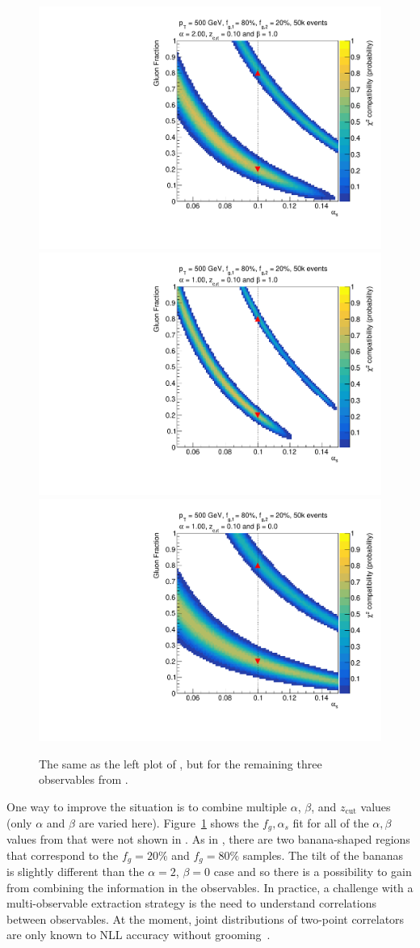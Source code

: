 \begin{figure}[t]
\begin{center}
\includegraphics[width = 0.32\columnwidth]{figures/banana_alpha_20beta_10_zcut_123451324.pdf}
\includegraphics[width = 0.32\columnwidth]{figures/banana_alpha_10beta_10_zcut_123451324.pdf}
\includegraphics[width = 0.32\columnwidth]{figures/banana_alpha_10beta_0_zcut_123451324.pdf}
\end{center}
\caption{The same as the left plot of , but for the remaining three observables from .}
\label{fig:morebananas}
\end{figure}


One way to improve the situation is to combine multiple $\alpha$, $\beta$, and $z_\text{cut}$ values (only $\alpha$ and $\beta$ are varied here).
%
Figure~\ref{fig:morebananas} shows the $f_g,\alpha_s$ fit for all of the $\alpha,\beta$ values from  that were not shown in .
%
As in , there are two banana-shaped regions that correspond to the $f_g=20\%$ and $f_g=80\%$ samples.
%
The tilt of the bananas is slightly different than the $\alpha=2$, $\beta=0$ case and so there is a possibility to gain from combining the information in the observables.
%
In practice, a challenge with a multi-observable extraction strategy is the need to understand correlations between observables.
%
At the moment, joint distributions of two-point correlators are only known to NLL accuracy without grooming~\cite{Larkoski:2014pca}.

